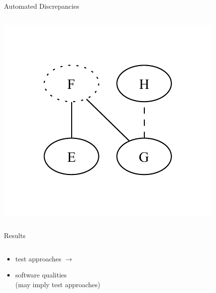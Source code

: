 \documentclass{beamer}
\begin{document}
\begin{frame}{Automated Discrepancies}
\begin{columns}[c]
\begin{column}{.4\textwidth}
            \includegraphics[width=\textwidth]{assets/graphs/SynExampleGlossaryGraph.pdf}
        \end{column}
    \end{columns} \pause
    \vspace{-0.25cm}
\end{frame}

\begin{frame}{Results}
    \begin{columns}
        \begin{column}{0.45\textwidth}
            \vspace{-1cm}
            \begin{itemize}
                \item \approachCount{} test approaches $\rightarrow$
                \item \qualityCount{} software qualities \\ \small (may imply test approaches)
            \end{itemize}
        \end{column}
        \begin{column}{0.55\textwidth}
            \centering
        \end{column}
    \end{columns}
\end{frame}
\end{document}
